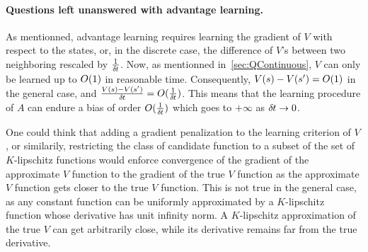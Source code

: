 \paragraph{Questions left unanswered with advantage learning.}
As mentionned, advantage learning requires learning the gradient of $V$
with respect to the states, or, in the discrete case, the difference of
$V$'s between two neighboring rescaled by $\frac{1}{\delta\hspace{-.06em}t}$. Now, as
mentionned in~\ref{sec:QContinuous}, $V$ can only be learned up to $O (1)$
in reasonable time. Consequently, $V(s) - V(s') = O (1)$ in the general case,
and $\frac{V(s) - V(s')}{\delta\hspace{-.06em}t} = O (\frac{1}{\delta\hspace{-.06em}t})$. This means that
the learning procedure of $A$ can endure a bias of order $O (\frac{1}{\delta\hspace{-.06em}t})$
which goes to $+\infty$ as $\delta\hspace{-.06em}t \to 0$.

One could think that adding a gradient penalization to the learning criterion of
$V$, or similarily, restricting the class of candidate function to a subset of 
the set of $K$-lipschitz functions would enforce convergence of the gradient of the
approximate $V$ function to the gradient of the true $V$ function as the approximate
$V$ function gets closer to the true $V$ function. This is not true
in the general case, as any constant function can be uniformly approximated by a
$K$-lipschitz function whose derivative has unit infinity norm. A $K$-lipschitz
approximation of the true $V$ can get arbitrarily close, while its derivative remains
far from the true derivative.
